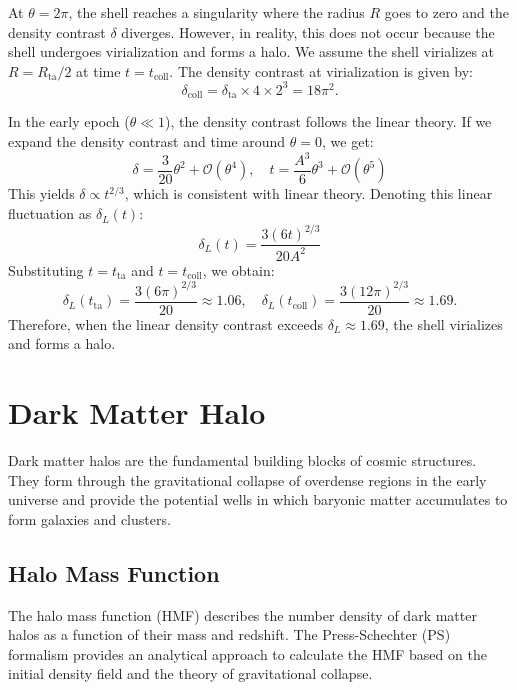 At $\theta = 2\pi$, the shell reaches a singularity where the radius $R$ goes to zero and the density contrast $\delta$ diverges. However, in reality, this does not occur because the shell undergoes virialization and forms a halo. We assume the shell virializes at $R = R_{\text{ta}}/2$ at time $t = t_{\text{coll}}$. The density contrast at virialization is given by:
\begin{equation}
    \delta_{\text{coll}} = \delta_{\text{ta}} \times 4 \times 2^3 = 18\pi^2.
\end{equation}

In the early epoch ($\theta \ll 1$), the density contrast follows the linear theory. If we expand the density contrast and time around $\theta = 0$, we get:
\begin{equation}
    \delta = \frac{3}{20} \theta^2 + \mathcal{O}(\theta^4), \quad t = \frac{A^3}{6} \theta^3 + \mathcal{O}(\theta^5)
\end{equation}
This yields $\delta \propto t^{2/3}$, which is consistent with linear theory. Denoting this linear fluctuation as $\delta_L(t)$:
\begin{equation}
    \delta_L(t) = \frac{3(6t)^{2/3}}{20A^2}
\end{equation}
Substituting $t = t_{\text{ta}}$ and $t = t_{\text{coll}}$, we obtain:
\begin{equation}
    \delta_L(t_{\text{ta}}) = \frac{3(6\pi)^{2/3}}{20} \approx 1.06, \quad \delta_L(t_{\text{coll}}) = \frac{3(12\pi)^{2/3}}{20} \approx 1.69.
\end{equation}
Therefore, when the linear density contrast exceeds $\delta_L \approx 1.69$, the shell virializes and forms a halo.

\section{Dark Matter Halo}
\label{sec:halo}
Dark matter halos are the fundamental building blocks of cosmic structures. They form through the gravitational collapse of overdense regions in the early universe and provide the potential wells in which baryonic matter accumulates to form galaxies and clusters. 

\subsection{Halo Mass Function}
The halo mass function (HMF) describes the number density of dark matter halos as a function of their mass and redshift. The Press-Schechter (PS) formalism \citep{1974ApJ...187..425P} provides an analytical approach to calculate the HMF based on the initial density field and the theory of gravitational collapse.

